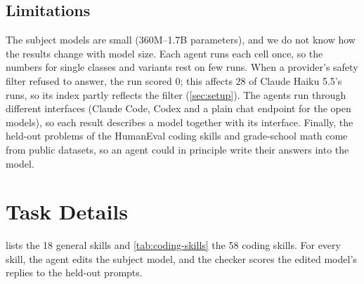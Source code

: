 \documentclass[11pt]{article}
\begin{document}
\subsection{Limitations}\label{sec:limitations}
The subject models are small (360M--1.7B parameters), and we do not know how the results change
with model size. Each agent runs each cell once, so the numbers for single classes and variants
rest on few runs. When a provider's safety filter refused to answer, the run scored 0; this affects 28 of Claude
Haiku 5.5's runs, so its index partly reflects the filter (\cref{sec:setup}). The agents run
through different interfaces (Claude Code, Codex and a plain chat endpoint for the open models),
so each result describes a model together with its interface. Finally, the held-out problems of
the HumanEval coding skills and grade-school math come from public datasets, so an agent could in
principle write their answers into the model.




\clearpage
\appendix
{}  %

\section{Task Details}\label{app:tasks}

 lists the 18 general skills and \cref{tab:coding-skills} the 58 coding
skills. For every skill, the agent edits the subject model, and the checker scores the edited
model's replies to the held-out prompts.
\end{document}

